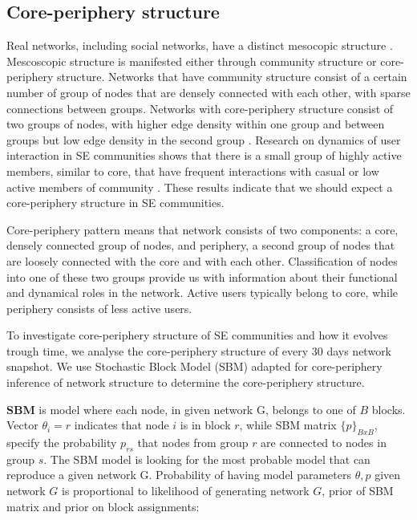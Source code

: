 \subsection{Core-periphery structure}

Real networks, including social networks, have a distinct mesocopic structure \cite{fortunato2010community, gallagher2020clarified}. Mescoscopic structure is manifested either through community structure or core-periphery structure. Networks that have community structure consist of a certain number of group of nodes that are densely connected with each other, with sparse connections between groups. Networks with core-periphery structure consist of two groups of nodes, with higher edge density within one group and between groups but low edge density in the second group \cite{gallagher2020clarified}. Research on dynamics of user interaction in SE communities shows that there is a small group of highly active members, similar to core,  that have frequent interactions with casual or low active members of community \cite{santos2019activity, santos2019self}. These results indicate that we should expect a core-periphery structure in SE communities. 

Core-periphery pattern means that network consists of two components: a core, densely connected group of nodes, and periphery, a second group of nodes that are loosely connected with the core and with each other. Classification of nodes into one of these two groups provide us with information about their functional and dynamical roles in the network. Active users typically belong to core, while periphery consists of less active users.

To investigate core-periphery structure of SE communities and how it evolves trough time, we analyse the core-periphery structure of every 30 days network snapshot. We use Stochastic Block Model (SBM) adapted for core-periphery inference of network structure \cite{gallagher2020clarified} to determine the core-periphery structure.  

\textbf{SBM} is model where each node, in given network G,  belongs to one of $B$ blocks. Vector $\theta_i = r$ indicates that node $i$ is in block $r$, while SBM matrix $\{p\}_{BxB}$, specify the probability $p_{rs}$ that nodes from group $r$ are connected to nodes in group $s$. The SBM model is looking for the most probable model that can reproduce a given network G. Probability of having model parameters $\theta, p$ given network $G$ is proportional to likelihood of generating network $G$, prior of SBM matrix and prior on block assignments:

